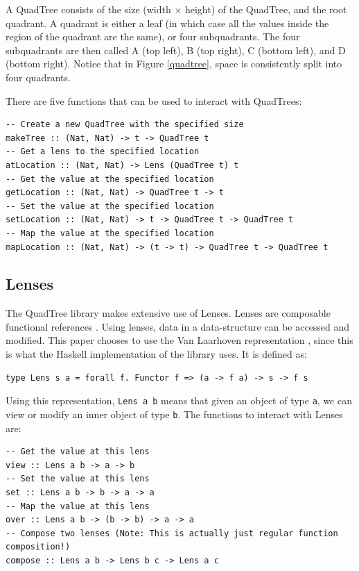 A QuadTree consists of the size (width  ×  height) of the QuadTree, and the root quadrant. A quadrant is either a leaf (in which case all the values inside the region of the quadrant are the same), or four subquadrants. The four subquadrants are then called A (top left), B (top right), C (bottom left), and D (bottom right). Notice that in Figure \ref{quadtree}, space is consistently split into four quadrants.

There are five functions that can be used to interact with QuadTrees:
\begin{verbatim}
-- Create a new QuadTree with the specified size
makeTree :: (Nat, Nat) -> t -> QuadTree t
-- Get a lens to the specified location
atLocation :: (Nat, Nat) -> Lens (QuadTree t) t
-- Get the value at the specified location
getLocation :: (Nat, Nat) -> QuadTree t -> t
-- Set the value at the specified location
setLocation :: (Nat, Nat) -> t -> QuadTree t -> QuadTree t
-- Map the value at the specified location
mapLocation :: (Nat, Nat) -> (t -> t) -> QuadTree t -> QuadTree t
\end{verbatim}

\subsection{Lenses}
The QuadTree library makes extensive use of Lenses. Lenses are composable functional references \cite{lens}. Using lenses, data in a data-structure can be accessed and modified. This paper chooses to use the Van Laarhoven representation \cite{laarhovenlens}, since this is what the Haskell implementation of the library uses. It is defined as:
\begin{verbatim}
type Lens s a = forall f. Functor f => (a -> f a) -> s -> f s
\end{verbatim}
Using this representation, \verb|Lens a b| means that given an object of type \verb|a|, we can view or modify an inner object of type \verb|b|.
The functions to interact with Lenses are:
\begin{verbatim}
-- Get the value at this lens
view :: Lens a b -> a -> b
-- Set the value at this lens
set :: Lens a b -> b -> a -> a
-- Map the value at this lens
over :: Lens a b -> (b -> b) -> a -> a
-- Compose two lenses (Note: This is actually just regular function composition!)
compose :: Lens a b -> Lens b c -> Lens a c
\end{verbatim}